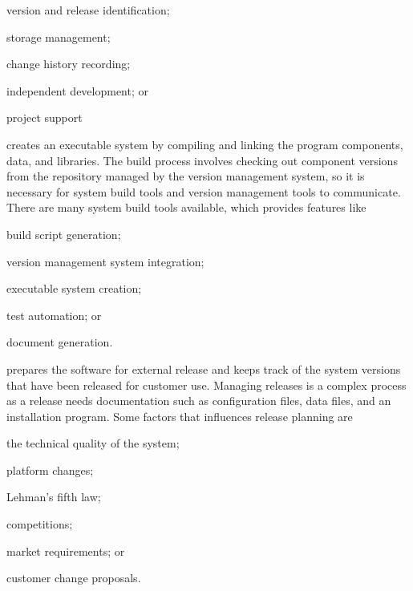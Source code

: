 \begin{description}
	\begin{inparaenum}
		\item version and release identification;
		\item storage management;
		\item change history recording;
		\item independent development; or
		\item project support
	\end{inparaenum}
	\item[System building] creates an executable system by compiling and linking the program components, data, and libraries. The build process involves checking out component versions from the repository managed by the version management system, so it is necessary for system build tools and version management tools to communicate. There are many system build tools available, which provides features like 
	\begin{inparaenum}
		\item build script generation;
		\item version management system integration;
		\item executable system creation;
		\item test automation; or
		\item document generation.
	\end{inparaenum}
	\item[Release management] prepares the software for external release and keeps track of the system versions that have been released for customer use. Managing releases is a complex process as a release needs documentation such as configuration files, data files, and an installation program. Some factors that influences release planning are
	\begin{inparaenum}
		\item the technical quality of the system;
		\item platform changes;
		\item Lehman's fifth law;
		\item competitions;
		\item market requirements; or
		\item customer change proposals.
	\end{inparaenum}
\end{description}

